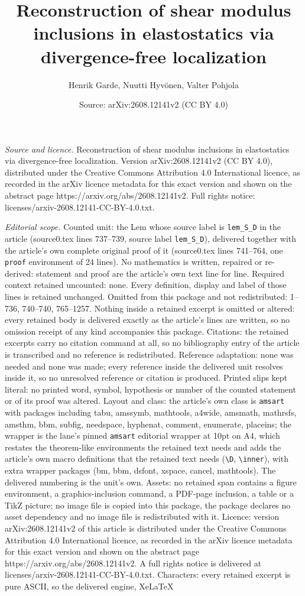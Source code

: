 \documentclass[10pt,a4paper]{amsart}
\title[Reconstruction of shear modulus inclusions in elastostatics ]{Reconstruction of shear modulus inclusions in elastostatics via divergence-free localization}
\author{Henrik Garde, Nuutti Hyv\"onen, Valter Pohjola}
\date{Source: arXiv:2608.12141v2 (CC BY 4.0)}
\begin{document}
\maketitle

\noindent\emph{Source and licence.} Reconstruction of shear modulus inclusions in elastostatics via divergence-free localization. Version arXiv:2608.12141v2 (CC BY 4.0), distributed under the Creative Commons Attribution 4.0 International licence, as recorded in the arXiv licence metadata for this exact version and shown on the abstract page https://arxiv.org/abs/2608.12141v2. Full rights notice: licenses/arxiv-2608.12141-CC-BY-4.0.txt.\par\smallskip

\noindent\textit{Editorial scope.} Counted unit: the Lem whose source label is \texttt{lem\_S\_D} in the article (source0.tex lines 737--739, source label \texttt{lem\_S\_D}), delivered together with the article's own complete original proof of it (source0.tex lines 741--764, one \texttt{proof} environment of 24 lines). No mathematics is written, repaired or re-derived: statement and proof are the article's own text line for line. Required context retained uncounted: none. Every definition, display and label of those lines is retained unchanged. Omitted from this package and not redistributed: 1--736, 740--740, 765--1257. Nothing inside a retained excerpt is omitted or altered: every retained body is delivered exactly as the article's lines are written, so no omission receipt of any kind accompanies this package. Citations: the retained excerpts carry no citation command at all, so no bibliography entry of the article is transcribed and no reference is redistributed. Reference adaptation: none was needed and none was made; every reference inside the delivered unit resolves inside it, so no unresolved reference or citation is produced. Printed slips kept literal: no printed word, symbol, hypothesis or number of the counted statement or of its proof was altered. Layout and class: the article's own class is \texttt{amsart} with packages including tabu, amssymb, mathtools, a4wide, amsmath, mathrsfs, amsthm, bbm, subfig, needspace, hyphenat, comment, enumerate, placeins; the wrapper is the lane's pinned \texttt{amsart} editorial wrapper at 10pt on A4, which restates the theorem-like environments the retained text needs and adds the article's own macro definitions that the retained text needs (\texttt{\textbackslash D}, \texttt{\textbackslash inner}), with extra wrapper packages (bm, bbm, dsfont, xspace, cancel, mathtools). The delivered numbering is the unit's own. Assets: no retained span contains a figure environment, a graphics-inclusion command, a PDF-page inclusion, a table or a TikZ picture; no image file is copied into this package, the package declares no asset dependency and no image file is redistributed with it. Licence: version arXiv:2608.12141v2 of this article is distributed under the Creative Commons Attribution 4.0 International licence, as recorded in the arXiv licence metadata for this exact version and shown on the abstract page https://arxiv.org/abs/2608.12141v2. A full rights notice is delivered at licenses/arxiv-2608.12141-CC-BY-4.0.txt. Characters: every retained excerpt is pure ASCII, so the delivered engine, XeLaTeX 
\end{document}
